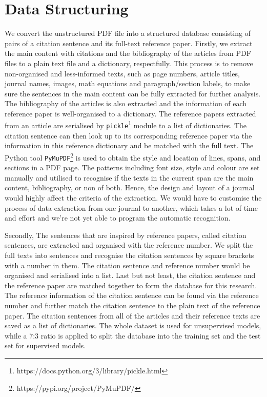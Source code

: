 \section{Data Structuring}
We convert the unstructured PDF file into a structured database consisting of pairs of a citation sentence and its full-text reference paper.
Firstly, we extract the main content with citations and the bibliography of the articles from PDF files to a plain text file and a dictionary, respectfully.
This process is to remove non-organised and less-informed texts, such as page numbers, article titles, journal names, images, math equations and paragraph/section labels, to make sure the sentences in the main content can be fully extracted for further analysis.
The bibliography of the articles is also extracted and the information of each reference paper is well-organised to a dictionary.
The reference papers extracted from an article are serialised by \texttt{pickle}\footnote{https://docs.python.org/3/library/pickle.html} module to a list of dictionaries.
The citation sentence can then look up to its corresponding reference paper via the information in this reference dictionary and be matched with the full text.
The Python tool \texttt{PyMuPDF}\footnote{https://pypi.org/project/PyMuPDF/} is used to obtain the style and location of lines, spans, and sections in a PDF page.
The patterns including font size, style and colour are set manually and utilised to recognise if the texts in the current span are the main content, bibliography, or non of both.
Hence, the design and layout of a journal would highly affect the criteria of the extraction.
We would have to customise the process of data extraction from one journal to another, which takes a lot of time and effort and we're not yet able to program the automatic recognition.

Secondly, The sentences that are inspired by reference papers, called citation sentences, are extracted and organised with the reference number.
We split the full texts into sentences and recognise the citation sentences by square brackets with a number in them.
The citation sentence and reference number would be organised and serialised into a list.
Last but not least, the citation sentence and the reference paper are matched together to form the database for this research.
The reference information of the citation sentence can be found via the reference number and further match the citation sentence to the plain text of the reference paper.
The citation sentences from all of the articles and their reference texts are saved as a list of dictionaries.
The whole dataset is used for unsupervised models, while a 7:3 ratio is applied to split the database into the training set and the test set for supervised models.

